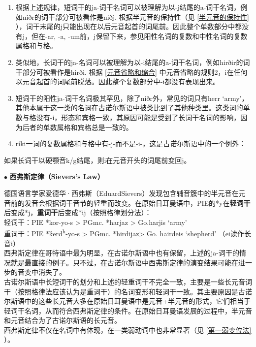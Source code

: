 \begin{enumerate}

  \item
        根据上述规律，短词干的ja-词干名词可以被理解为以-j结尾的a-词干名词，例如niðr的词干部分可被看作是niðj.
        根据半元音的保持性（见 \ref{半元音的保持性} ），词干末尾的j只能出现在以后元音起首的词尾前。因此整个单数部分中都没有j，但在-ar,
        -a, -um前，j保留下来，参见阳性名词的复数和中性名词的复数属格和与格。
  \item
        类似地，长词干的ja-名词可以被理解为以-i结尾的a-词干名词，例如hirðir的词干部分可被看作是hirði.
        根据 \ref{元音省略和缩合} 中元音省略的规则2，i在任何以元音起首的词尾前脱落。因此整个复数部分中-i都没有表现出来。
  \item
        短词干的阳性ja-词干名词极其罕见，除了niðr外，常见的词只有herr
        `army'，其他本属于这一类的名词在古诺尔斯语中被类比到了其他种类里。这类词的单数与格没有-i，形态和宾格一致，其原因可能是受到了长词干名词的影响，因为后者的单数属格和宾格总是一致的。
  \item
        ríki一词的复数属格和与格中有-j-而不是-i-，这是古诺尔斯语中的一个例外：
\end{enumerate}
\begin{info}
  如果长词干以硬颚音k/g结尾，则i在元音开头的词尾前变回j。
\end{info}

\begin{info}
  $\bullet$ \textbf{西弗斯定律（Sievers's Law）}

  \indent
  德国语言学家爱德华·西弗斯（EduardSievers）发现包含辅音簇中的半元音在元音前的发音会根据词干音节的轻重而改变。在原始日耳曼语中，PIE的*y在\textbf{轻词干}后变成*j，\textbf{重词干}后变成*ij（按照格律划分法）：\\
  \indent
  轻词干：PIE *kor-yo-s \textgreater{} PGmc. *harjaz \textgreater{} Go.harjis `army'\\
  \indent
  重词干：PIE *ḱerd\textsuperscript{h}-yo-s \textgreater{} PGmc. *hirdijaz\textgreater{} Go. hairdeis `shepherd' （ei读作长音i）\\
  \indent
  西弗斯定律在哥特语中最为明显，在古诺尔斯语中也有保留，上述的ja-词干的情况就是最直接的例子。只不过，在古诺尔斯语中西弗斯定律的演变结果可能在进一步的音变中消失了。\\
  \indent
  古诺尔斯语中长短词干的划分和上述的轻重词干不完全一致，主要是一些长元音词干（按照格律法应该认为是重词干）的名词变形和轻词干一致。其主要原因是古诺尔斯语中的这些长元音大多在原始日耳曼语中是元音+半元音的形式，它们相当于轻词干名词，从而符合西弗斯定律的条件。在原始日耳曼语发展的过程中，半元音和元音结合为了古诺尔斯语的长元音。\\
  \indent
  西弗斯定律不仅在名词中有体现，在一类弱动词中也非常显著（见 \ref{第一弱变位法} ）。
\end{info}

